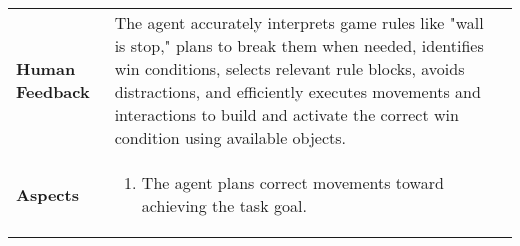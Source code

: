 \documentclass{article}
\begin{document}
\begin{table}[!t]
\begin{tabular}{p{1.5cm}p{4cm}p{4cm}}
			\textbf{Human Feedback}                                                                                                                                                                                                                                                                                     &                                                                                                                                                                                                                                                                                                                                                                   %
			The agent accurately interprets game rules like "wall is stop," plans to break them when needed, identifies win conditions, selects relevant rule blocks, avoids distractions, and efficiently executes movements and interactions to build and activate the correct win condition using available objects. &                                                                                                                                                                                                                                                                                                                                                                   \\
			\textbf{Aspects}                                                                                                                                                                                                                                                                                            & \begin{enumerate}[left=0pt]\item The agent plans correct movements toward achieving the task goal.


\end{enumerate}
\end{tabular}
\end{table}
\end{document}
